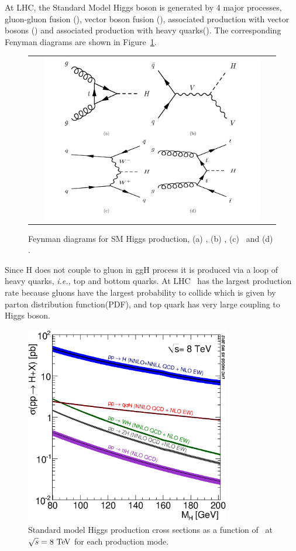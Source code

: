At LHC, the Standard Model Higgs boson is generated by 4 major processes, 
gluon-gluon fusion (\ggH), 
vector boson fusion (\qqH),
associated production with vector bosons (\qqVH) and 
associated production with heavy quarks(\ttH).
The corresponding Fenyman diagrams are shown in Figure~\ref{fig:FD_HiggsProduction}.
\begin{figure}[htp] 
\centering 
\begin{tabular}{c} 
\includegraphics[width=0.9\textwidth]{figures/FD_HiggsProduction.pdf} 
\end{tabular} 
\caption{Feynman diagrams for SM Higgs production, (a) \ggH, (b) \qqVH, (c) \qqH\ and (d) \ttH.} 
\label{fig:FD_HiggsProduction} 
\end{figure} 
Since H does not couple to gluon in ggH process it is produced via a loop of 
heavy quarks, \textit{i.e.,} top and bottom quarks.
At LHC \ggH\ has the largest production rate because gluons have 
the largest probability to collide which is given by parton distribution function(PDF), 
and top quark has very large coupling to Higgs boson. 
\begin{figure}[t]
\centering
\includegraphics[width=0.8\textwidth]{figures/Higgs_XS_8TeV_LM200.eps}
\caption{ Standard model Higgs production cross sections 
as a function of \mHi\ at $\sqrt{s}=8~\mathrm{Te\kern -0.1em V}$ for each 
production mode. %
}
\label{fig:Higgs_XS_8TeV_LM200}
\end{figure}

